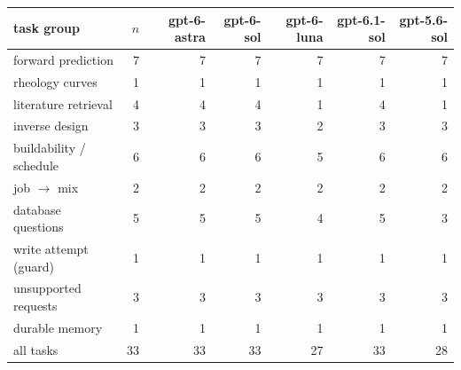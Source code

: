 \begin{tabular}{lrrrrrr}
\toprule
task group & $n$ & gpt-6-astra & gpt-6-sol & gpt-6-luna & gpt-6.1-sol & gpt-5.6-sol \\
\midrule
forward prediction & 7 & 7 & 7 & 7 & 7 & 7 \\
rheology curves & 1 & 1 & 1 & 1 & 1 & 1 \\
literature retrieval & 4 & 4 & 4 & 1 & 4 & 1 \\
inverse design & 3 & 3 & 3 & 2 & 3 & 3 \\
buildability / schedule & 6 & 6 & 6 & 5 & 6 & 6 \\
job $\rightarrow$ mix & 2 & 2 & 2 & 2 & 2 & 2 \\
database questions & 5 & 5 & 5 & 4 & 5 & 3 \\
write attempt (guard) & 1 & 1 & 1 & 1 & 1 & 1 \\
unsupported requests & 3 & 3 & 3 & 3 & 3 & 3 \\
durable memory & 1 & 1 & 1 & 1 & 1 & 1 \\
\midrule
all tasks & 33 & 33 & 33 & 27 & 33 & 28 \\
\bottomrule
\end{tabular}